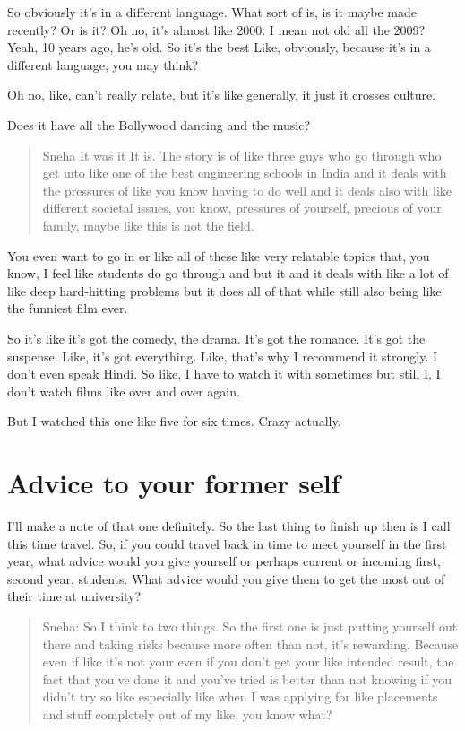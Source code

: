 \documentclass[
]{book}
\begin{document}
So obviously it's in a different language. What sort of is, is it maybe made recently? Or is it? Oh no, it's almost like 2000. I mean not old all the 2009? Yeah, 10 years ago, he's old. So it's the best Like, obviously, because it's in a different language, you may think?

Oh no, like, can't really relate, but it's like generally, it just it crosses culture.

Does it have all the Bollywood dancing and the music?

\begin{quote}
Sneha It was it It is. The story is of like three guys who go through who get into like one of the best engineering schools in India and it deals with the pressures of like you know having to do well and it deals also with like different societal issues, you know, pressures of yourself, precious of your family, maybe like this is not the field.
\end{quote}

You even want to go in or like all of these like very relatable topics that, you know, I feel like students do go through and but it and it deals with like a lot of like deep hard-hitting problems but it does all of that while still also being like the funniest film ever.

So it's like it's got the comedy, the drama. It's got the romance. It's got the suspense. Like, it's got everything. Like, that's why I recommend it strongly. I don't even speak Hindi. So like, I have to watch it with sometimes but still I, I don't watch films like over and over again.

But I watched this one like five for six times. Crazy actually.

\hypertarget{sselfie}{%
\section{Advice to your former self}\label{sselfie}}

I'll make a note of that one definitely. So the last thing to finish up then is I call this time travel. So, if you could travel back in time to meet yourself in the first year, what advice would you give yourself or perhaps current or incoming first, second year, students. What advice would you give them to get the most out of their time at university?

\begin{quote}
Sneha: So I think to two things. So the first one is just putting yourself out there and taking risks because more often than not, it's rewarding. Because even if like it's not your even if you don't get your like intended result, the fact that you've done it and you've tried is better than not knowing if you didn't try so like especially like when I was applying for like placements and stuff completely out of my like, you know what?
\end{quote}
\end{document}
